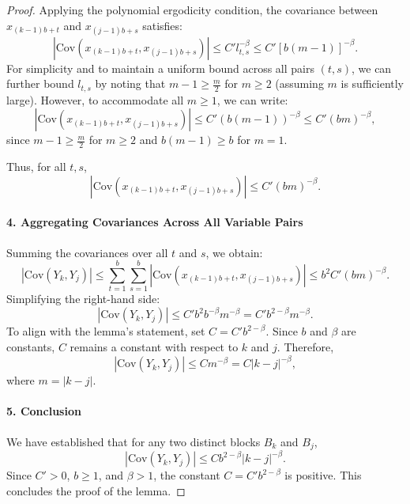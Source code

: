 \begin{proof}
Applying the polynomial ergodicity condition, the covariance between \(x_{(k-1)b + t}\) and \(x_{(j-1)b + s}\) satisfies:
\[
|\text{Cov}(x_{(k-1)b + t}, x_{(j-1)b + s})| \leq C' l_{t,s}^{-\beta} \leq C' [b(m - 1)]^{-\beta}.
\]
For simplicity and to maintain a uniform bound across all pairs \((t, s)\), we can further bound \(l_{t,s}\) by noting that \(m - 1 \geq \frac{m}{2}\) for \(m \geq 2\) (assuming \(m\) is sufficiently large). However, to accommodate all \(m \geq 1\), we can write:
\[
|\text{Cov}(x_{(k-1)b + t}, x_{(j-1)b + s})| \leq C' (b(m - 1))^{-\beta} \leq C' (b m)^{-\beta},
\]
since \(m - 1 \geq \frac{m}{2}\) for \(m \geq 2\) and \(b(m - 1) \geq b\) for \(m = 1\).

Thus, for all \(t, s\),
\[
|\text{Cov}(x_{(k-1)b + t}, x_{(j-1)b + s})| \leq C' (b m)^{-\beta}.
\]

\paragraph{4. Aggregating Covariances Across All Variable Pairs}

Summing the covariances over all \(t\) and \(s\), we obtain:
\[
|\text{Cov}(Y_k, Y_j)| \leq \sum_{t=1}^{b} \sum_{s=1}^{b} |\text{Cov}(x_{(k-1)b + t}, x_{(j-1)b + s})| \leq b^2 C' (b m)^{-\beta}.
\]
Simplifying the right-hand side:
\[
|\text{Cov}(Y_k, Y_j)| \leq C' b^2 b^{-\beta} m^{-\beta} = C' b^{2 - \beta} m^{-\beta}.
\]
To align with the lemma's statement, set \(C = C' b^{2 - \beta}\). Since \(b\) and \(\beta\) are constants, \(C\) remains a constant with respect to \(k\) and \(j\). Therefore,
\[
|\text{Cov}(Y_k, Y_j)| \leq C m^{-\beta} = C |k - j|^{-\beta},
\]
where \(m = |k - j|\).

\paragraph{5. Conclusion}

We have established that for any two distinct blocks \(B_k\) and \(B_j\),
\[
|\text{Cov}(Y_k, Y_j)| \leq C b^{2 - \beta} |k - j|^{-\beta}.
\]
Since \(C' > 0\), \(b \geq 1\), and \(\beta > 1\), the constant \(C = C' b^{2 - \beta}\) is positive. This concludes the proof of the lemma.

\end{proof}
